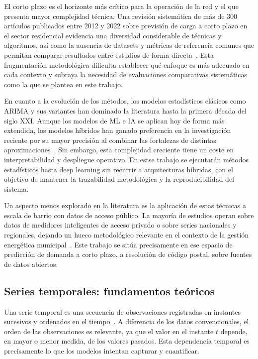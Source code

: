 \documentclass[12pt, a4paper]{article}
\begin{document}
El corto plazo es el horizonte más crítico para la operación de la red y el que presenta mayor complejidad técnica. Una revisión sistemática de más de 300 artículos publicados entre 2012 y 2022 sobre previsión de carga a corto plazo en el sector residencial evidencia una diversidad considerable de técnicas y algoritmos, así como la ausencia de datasets y métricas de referencia comunes que permitan comparar resultados entre estudios de forma directa~\cite{melicio2023}. Esta fragmentación metodológica dificulta establecer qué enfoque es más adecuado en cada contexto y subraya la necesidad de evaluaciones comparativas sistemáticas como la que se plantea en este trabajo.

En cuanto a la evolución de los métodos, los modelos estadísticos clásicos como ARIMA y sus variantes han dominado la literatura hasta la primera década del siglo XXI. Aunque los modelos de ML e IA se aplican hoy de forma más extendida, los modelos híbridos han ganado preferencia en la investigación reciente por su mayor precisión al combinar las fortalezas de distintas aproximaciones~\cite{ugbehe2025}. Sin embargo, esta complejidad creciente tiene un coste en interpretabilidad y despliegue operativo. En estse trabajo se ejecutarán métodos estadísticos hasta deep learning sin recurrir a arquitecturas híbridas, con el objetivo de mantener la trazabilidad metodológica y la reproducibilidad del sistema.

Un aspecto menos explorado en la literatura es la aplicación de estas técnicas a escala de barrio con datos de acceso público. La mayoría de estudios operan sobre datos de medidores inteligentes de acceso privado o sobre series nacionales y regionales, dejando un hueco metodológico relevante en el contexto de la gestión energética municipal~\cite{jiang2024}. Este trabajo se sitúa precisamente en ese espacio de predicción de demanda a corto plazo, a resolución de código postal, sobre fuentes de datos abiertos.

\subsection{Series temporales: fundamentos teóricos}

Una serie temporal es una secuencia de observaciones registradas en instantes sucesivos y ordenados en el tiempo~\cite{hyndman2021}. A diferencia de los datos convencionales, el orden de las observaciones es relevante, ya que el valor en el instante $t$ depende, en mayor o menor medida, de los valores pasados. Esta dependencia temporal es precisamente lo que los modelos intentan capturar y cuantificar.
\end{document}
